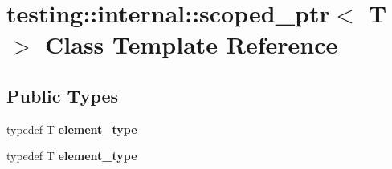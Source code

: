 \hypertarget{classtesting_1_1internal_1_1scoped__ptr}{}\section{testing\+:\+:internal\+:\+:scoped\+\_\+ptr$<$ T $>$ Class Template Reference}
\label{classtesting_1_1internal_1_1scoped__ptr}
\subsection*{Public Types}
\begin{DoxyCompactItemize}
\item 
\hypertarget{classtesting_1_1internal_1_1scoped__ptr_ae755ffeebada8e20b68c1d1ffa91cf13}{}typedef T {\bfseries element\+\_\+type}\label{classtesting_1_1internal_1_1scoped__ptr_ae755ffeebada8e20b68c1d1ffa91cf13}

\item 
\hypertarget{classtesting_1_1internal_1_1scoped__ptr_ae755ffeebada8e20b68c1d1ffa91cf13}{}typedef T {\bfseries element\+\_\+type}\label{classtesting_1_1internal_1_1scoped__ptr_ae755ffeebada8e20b68c1d1ffa91cf13}

\end{DoxyCompactItemize}
